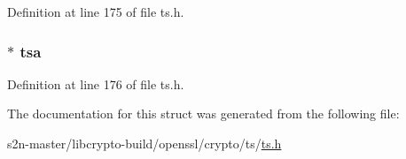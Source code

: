Definition at line 175 of file ts.\+h.

\subsubsection[{\texorpdfstring{tsa}{tsa}}]{ $\ast$ tsa}\hypertarget{struct_t_s__tst__info__st_ae78ca5f851cd20267443f211aec6cd16}{}\label{struct_t_s__tst__info__st_ae78ca5f851cd20267443f211aec6cd16}


Definition at line 176 of file ts.\+h.



The documentation for this struct was generated from the following file\+:\begin{DoxyCompactItemize}
\item 
s2n-\/master/libcrypto-\/build/openssl/crypto/ts/\hyperlink{crypto_2ts_2ts_8h}{ts.\+h}\end{DoxyCompactItemize}
